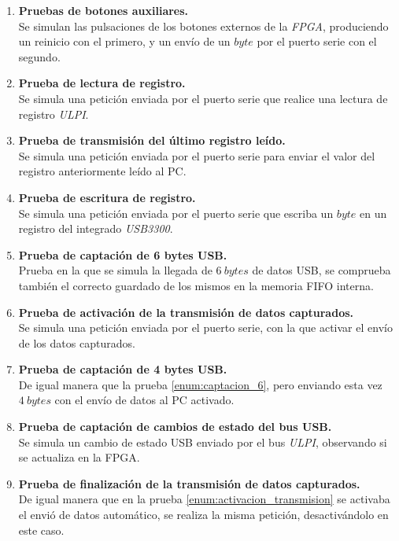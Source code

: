 \begin{enumerate}
    \item \textbf{Pruebas de botones auxiliares.} \\
    Se simulan las pulsaciones de los botones externos de la \emph{FPGA}, produciendo un reinicio con el primero, y un envío de un $byte$ por el puerto serie con el segundo.

    \item \textbf{Prueba de lectura de registro.} \\
    Se simula una petición enviada por el puerto serie que realice una lectura de registro \emph{ULPI}.
    
    \item \textbf{Prueba de transmisión del último registro leído.} \\
    Se simula una petición enviada por el puerto serie para enviar el valor del registro anteriormente leído al PC.
    
    \item \textbf{Prueba de escritura de registro.} \\
    Se simula una petición enviada por el puerto serie que escriba un $byte$ en un registro del integrado \emph{USB3300}.
    
    \item \textbf{Prueba de captación de 6 bytes USB.}{\label{enum:captacion_6}} \\
    Prueba en la que se simula la llegada de $6~bytes$ de datos USB, se comprueba también el correcto guardado de los mismos en la memoria FIFO interna.
    
    \item \textbf{Prueba de activación de la transmisión de datos capturados.}{\label{enum:activacion_transmision}} \\
    Se simula una petición enviada por el puerto serie, con la que activar el envío de los datos capturados.
    
    \item \textbf{Prueba de captación de 4 bytes USB.} \\
    De igual manera que la prueba \ref{enum:captacion_6}, pero enviando esta vez $4~bytes$ con el envío de datos al PC activado.
    
    \item \textbf{Prueba de captación de cambios de estado del bus USB.} \\
    Se simula un cambio de estado USB enviado por el bus \emph{ULPI}, observando si se actualiza en la FPGA.
    
    \item \textbf{Prueba de finalización de la transmisión de datos capturados.} \\
    De igual manera que en la prueba \ref{enum:activacion_transmision} se activaba el envió de datos automático, se realiza la misma petición, desactivándolo en este caso.
\end{enumerate}


